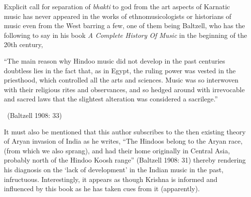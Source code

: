 Explicit call for separation of \textit{bhakti} to god from the art aspects of Karnatic music has never appeared in the works of ethnomusicologists or historians of music even from the West barring a few, one of them being Baltzell, who has the following to say in his book \textit{A Complete History Of Music} in the beginning of the 20th century,

\vspace{.1cm}

\begin{myquote}
“The main reason why Hindoo music did not develop in the past centuries doubtless lies in the fact that, as in Egypt, the ruling power was vested in the priesthood, which controlled all the arts and sciences. Music was so interwoven with their religious rites and observances, and so hedged around with irrevocable and sacred laws that the slightest alteration was considered a sacrilege.” 

~\hfill (Baltzell 1908: 33)
\end{myquote}

It must also be mentioned that this author subscribes to the then existing theory of Aryan invasion of India as he writes, “The Hindoos belong to the Aryan race, (from which we also sprang), and had their home originally in Central Asia, probably north of the Hindoo Koosh range” (Baltzell 1908: 31) thereby rendering his diagnosis on the ‘lack of development’ in the Indian music in the past, infructuous. Interestingly, it appears as though Krishna is informed and influenced by this book as he has taken cues from it (apparently).

